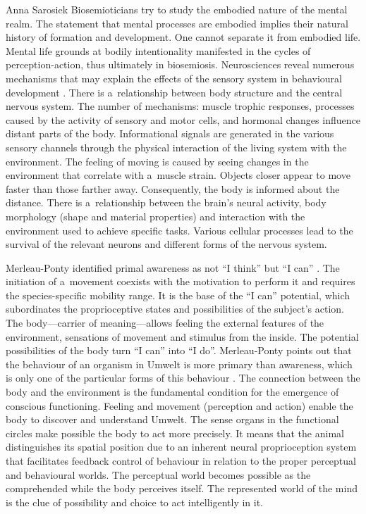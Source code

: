 \begin{artengenv}{Anna Sarosiek}
Biosemioticians try to study the embodied nature of the mental realm. The statement that mental processes are embodied implies their natural history of formation and development. One cannot separate it from embodied life. Mental life grounds at bodily intentionality manifested in the cycles of perception-action, thus ultimately in biosemiosis. Neurosciences reveal numerous mechanisms that may explain the effects of the sensory system in behavioural development
\parencite[][pp.19–20]{purves_body_1988}. %
 There is a~relationship between body structure and the central nervous system. The number of mechanisms: muscle trophic responses, processes caused by the activity of sensory and motor cells, and hormonal changes influence distant parts of the body. Informational signals are generated in the various sensory channels through the physical interaction of the living system with the environment. The feeling of moving is caused by seeing changes in the environment that correlate with a~muscle strain. Objects closer appear to move faster than those farther away. Consequently, the body is informed about the distance. There is a~relationship between the brain’s neural activity, body morphology (shape and material properties) and interaction with the environment used to achieve specific tasks. Various cellular processes lead to the survival of the relevant neurons and different forms of the nervous system.

Merleau-Ponty identified primal awareness as not ``I think'' but ``I can''
\parencite[][p.156]{merleau-ponty_fenomenologia_2001}. %
 The initiation of a~movement coexists with the motivation to perform it and requires the species-specific mobility range. It is the base of the ``I can'' potential, which subordinates the proprioceptive states and possibilities of the subject’s action. The body---carrier of meaning---allows feeling the external features of the environment, sensations of movement and stimulus from the inside. The potential possibilities of the body turn ``I can'' into ``I do''. Merleau-Ponty points out that the behaviour of an organism in Umwelt is more primary than awareness, which is only one of the particular forms of this behaviour 
\parencite[][p.239,393]{merleau-ponty_fenomenologia_2001}. %
 The connection between the body and the environment is the fundamental condition for the emergence of conscious functioning. Feeling and movement (perception and action) enable the body to discover and understand Umwelt. The sense organs in the functional circles make possible the body to act more precisely. It means that the animal distinguishes its spatial position due to an inherent neural proprioception system that facilitates feedback control of behaviour in relation to the proper perceptual and behavioural worlds. The perceptual world becomes possible as the comprehended while the body perceives itself. The represented world of the mind is the clue of possibility and choice to act intelligently in it.


\end{artengenv}
